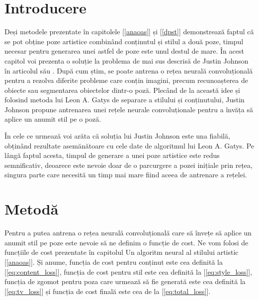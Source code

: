 \section{Introducere}
Deși metodele prezentate în capitolele [\ref{anaoas}] și [\ref{dpst}] demonstrează faptul că se pot obține poze artistice combinând conținutul și stilul a două poze, timpul necesar pentru generarea unei astfel de poze este unul destul de mare. În acest capitol voi prezenta o soluție la problema de mai sus descrisă de Justin Johnson în articolul său \cite{johnson2016}. După cum știm, se poate antrena o rețea neurală convoluțională pentru a rezolva diferite probleme care conțin imagini, precum recunoașterea de obiecte sau segmentarea obiectelor dintr-o poză. Plecând de la această idee și folosind metoda lui Leon A. Gatys de separare a stilului și conținutului, Justin Johnson propune antrenarea unei rețele neurale convoluționale pentru a învăța să aplice un anumit stil pe o poză.

În cele ce urmează voi arăta că soluția lui Justin Johnson este una fiabilă, obținând rezultate asemănătoare cu cele date de algoritmul lui Leon A. Gatys. Pe lângă faptul acesta, timpul de generare a unei poze artistice este redus semnificativ, deoarece este nevoie doar de o parcurgere a pozei inițiale prin rețea, singura parte care necesită un timp mai mare fiind aceea de antrenare a rețelei.

\section{Metodă}
Pentru a putea antrena o rețea neurală convoluțională care să învețe să aplice un anumit stil pe poze este nevoie să ne definim o funcție de cost. Ne vom folosi de funcțiile de cost prezentate în capitolul Un algoritm neural al stilului artistic [\ref{anaoas}]. Și anume, funcția de cost pentru conținut este cea definită la [\ref{eq:content_loss}], funcția de cost pentru stil este cea definită la [\ref{eq:style_loss}], funcția de zgomot pentru poza care urmează să fie generată este cea definită la [\ref{eq:tv_loss}] și funcția de cost finală este cea de la [\ref{eq:total_loss}].

